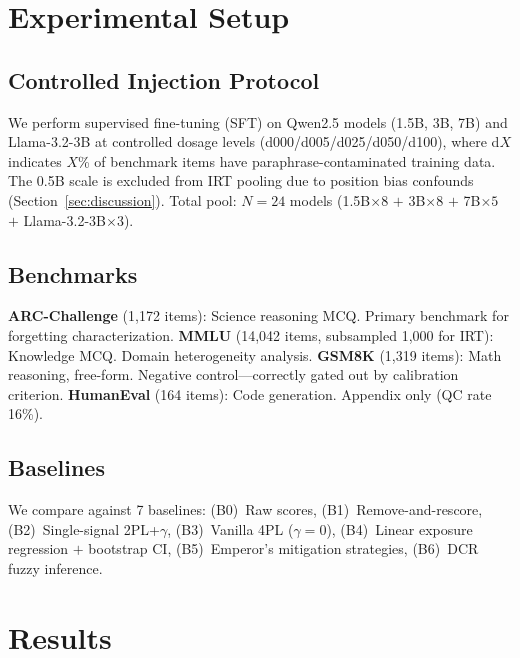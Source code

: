 \documentclass[11pt,a4paper]{article}
\newcommand{\gam}{\gamma}
\begin{document}
\section{Experimental Setup}

\subsection{Controlled Injection Protocol}

We perform supervised fine-tuning (SFT) on Qwen2.5 models (1.5B, 3B, 7B) and Llama-3.2-3B at controlled dosage levels (d000/d005/d025/d050/d100), where d$X$ indicates $X$\% of benchmark items have paraphrase-contaminated training data. The 0.5B scale is excluded from IRT pooling due to position bias confounds (Section~\ref{sec:discussion}). Total pool: $N{=}24$ models (1.5B${\times}8$ $+$ 3B${\times}8$ $+$ 7B${\times}5$ $+$ Llama-3.2-3B${\times}3$).

\subsection{Benchmarks}

\textbf{ARC-Challenge} (1,172 items): Science reasoning MCQ. Primary benchmark for forgetting characterization.
\textbf{MMLU} (14,042 items, subsampled 1,000 for IRT): Knowledge MCQ. Domain heterogeneity analysis.
\textbf{GSM8K} (1,319 items): Math reasoning, free-form. Negative control---correctly gated out by calibration criterion.
\textbf{HumanEval} (164 items): Code generation. Appendix only (QC rate 16\%).

\subsection{Baselines}

We compare against 7 baselines: (B0)~Raw scores, (B1)~Remove-and-rescore, (B2)~Single-signal 2PL+$\gam$, (B3)~Vanilla 4PL ($\gam{=}0$), (B4)~Linear exposure regression $+$ bootstrap CI, (B5)~Emperor's mitigation strategies, (B6)~DCR fuzzy inference.

\section{Results}
\end{document}

